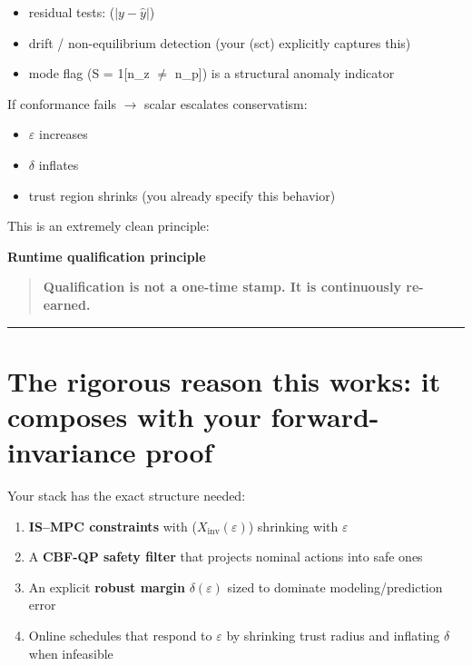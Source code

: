\documentclass[11pt,a4paper]{article}
\begin{document}
\begin{itemize}
\item residual tests: ($|y - \hat y|$)
\item drift / non-equilibrium detection (your (sct) explicitly captures this)
\item mode flag (S = 1[n\_z $\ne$ n\_p]) is a structural anomaly indicator
\end{itemize}

If conformance fails $\to$ scalar escalates conservatism:

\begin{itemize}
\item $\varepsilon$ increases
\item $\delta$ inflates
\item trust region shrinks (you already specify this behavior)
\end{itemize}

This is an extremely clean principle:

\begin{schema}
\textbf{Runtime qualification principle}\\[-0.25em]
\begin{quote}
\textbf{Qualification is not a one-time stamp. It is continuously re-earned.}
\end{quote}
\end{schema}

\hrule
\vspace{0.75em}

\section{The rigorous reason this works: it composes with your forward-invariance proof}

Your stack has the exact structure needed:

\begin{enumerate}
\item \textbf{IS--MPC constraints} with ($X_{\text{inv}}(\varepsilon)$) shrinking with $\varepsilon$
\item A \textbf{CBF-QP safety filter} that projects nominal actions into safe ones
\item An explicit \textbf{robust margin} $\delta(\varepsilon)$ sized to dominate modeling/prediction error
\item Online schedules that respond to $\varepsilon$ by shrinking trust radius and inflating $\delta$ when infeasible
\end{enumerate}
\end{document}
